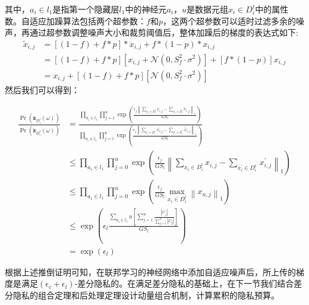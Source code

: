 其中，$a_{i} \in l_{1}$是指第一个隐藏层$l_{1}$中的神经元$a_{i}$，$u$是数据元组$x_{i} \in D_{i}^{t}$中的属性数。自适应加躁算法包括两个超参数：$f$和$p$，这两个超参数可以适时过滤多余的噪声，再通过超参数调整噪声大小和裁剪阈值后，整体加躁后的梯度的表达式如下:
\begin{equation}
\begin{aligned}
\tilde{x}_{i, j} &=[(1-f)+f * p] * \ddot{x}_{i, j}+f *(1-p) * x_{i, j} \\
&=[(1-f)+f * p]\left[x_{i, j}+\mathcal{N}\left(0, S_{f}^{2} \cdot \sigma^{2}\right)\right]+[f *(1-p)] x_{i, j} \\
&=x_{i, j}+[(1-f)+f * p]\left[\mathcal{N}\left(0, S_{f}^{2} \cdot \sigma^{2}\right)\right]
\end{aligned}
\end{equation}
然后我们可以得到：

\begin{equation}
\begin{aligned}
\frac{\operatorname{Pr}\left(\ddot{\mathbf{z}}_{D_{i}^{t}}(\omega)\right)}{\operatorname{Pr}\left(\ddot{\mathbf{z}}_{D_{i}^{t}}(\omega)\right)} &=\frac{\prod_{a_{i} \in l_{1}} \prod_{j=1}^{u} \exp \left(\frac{\epsilon_{j}\left\|\sum_{x_{i} \in D_{i}^{t}} x_{i, j}-\sum_{x_{i} \in D_{i}^{t}} \tilde{x}_{i, j}\right\|_{1}}{G S_{l}}\right)}{\prod_{a_{i} \in l_{1}} \prod_{j=1}^{u} \exp \left(\frac{\epsilon_{j}\left\|\sum_{x_{i}^{\prime} \in D_{i}^{t^{\prime}}} x_{i, j}^{\prime}-\sum_{x_{i}^{\prime} \in D_{i}^{t^{\prime}}} \tilde{x}_{i, j}^{\prime}\right\|_{1}}{G S_{l}}\right)} \\
& \leq \prod_{a_{i} \in l_{1}} \prod_{j=0}^{u} \exp \left(\frac{\epsilon_{j}}{G S_{l}}\left\|\sum_{x_{i} \in D_{i}^{t}} x_{i, j}-\sum_{x_{i}^{\prime} \in D_{i}^{t^{\prime}}} x_{i, j}^{\prime}\right\|_{1}\right) \\
& \leq \prod_{a_{i} \in l_{1}} \prod_{j=0}^{u} \exp \left(\frac{\epsilon_{j}}{G S_{l}} \max _{x_{i} \in D_{i}^{t}}\left\|x_{n, j}\right\|_{1}\right) \\
& \leq \exp \left(\epsilon_{l} \frac{\sum_{a_{i} \in l_{1}} u\left[\sum_{j=1}^{u} \frac{\left|\ddot{C}_{j}\right|}{\sum_{j=1}^{u}\left|\ddot{C}_{j}\right|}\right]}{G S_{l}}\right) \\
&=\exp \left(\epsilon_{l}\right)
\end{aligned}
\end{equation}

根据上述推倒证明可知，在联邦学习的神经网络中添加自适应噪声后，所上传的梯度是满足$\left(\epsilon_{c}+\epsilon_{l}\right)$-差分隐私的。在满足差分隐私的基础上，在下一节我们结合差分隐私的组合定理和后处理定理设计动量组合机制，计算累积的隐私预算。

